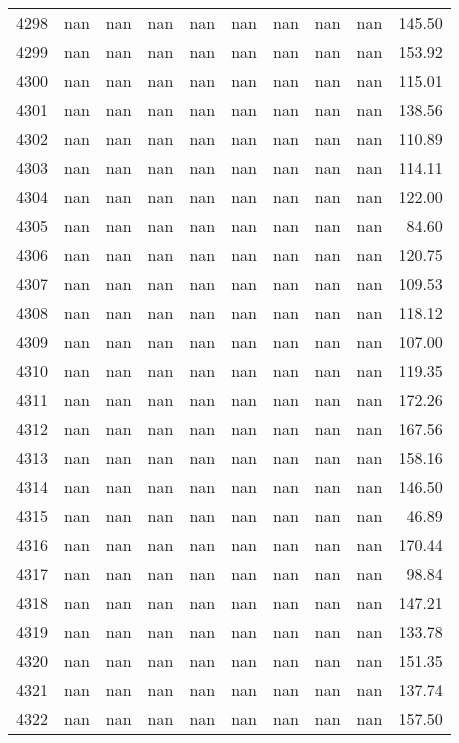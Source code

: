 \begin{tabular}{lrrrrrrrrr}
4298 & nan & nan & nan & nan & nan & nan & nan & nan & 145.50 \\
4299 & nan & nan & nan & nan & nan & nan & nan & nan & 153.92 \\
4300 & nan & nan & nan & nan & nan & nan & nan & nan & 115.01 \\
4301 & nan & nan & nan & nan & nan & nan & nan & nan & 138.56 \\
4302 & nan & nan & nan & nan & nan & nan & nan & nan & 110.89 \\
4303 & nan & nan & nan & nan & nan & nan & nan & nan & 114.11 \\
4304 & nan & nan & nan & nan & nan & nan & nan & nan & 122.00 \\
4305 & nan & nan & nan & nan & nan & nan & nan & nan & 84.60 \\
4306 & nan & nan & nan & nan & nan & nan & nan & nan & 120.75 \\
4307 & nan & nan & nan & nan & nan & nan & nan & nan & 109.53 \\
4308 & nan & nan & nan & nan & nan & nan & nan & nan & 118.12 \\
4309 & nan & nan & nan & nan & nan & nan & nan & nan & 107.00 \\
4310 & nan & nan & nan & nan & nan & nan & nan & nan & 119.35 \\
4311 & nan & nan & nan & nan & nan & nan & nan & nan & 172.26 \\
4312 & nan & nan & nan & nan & nan & nan & nan & nan & 167.56 \\
4313 & nan & nan & nan & nan & nan & nan & nan & nan & 158.16 \\
4314 & nan & nan & nan & nan & nan & nan & nan & nan & 146.50 \\
4315 & nan & nan & nan & nan & nan & nan & nan & nan & 46.89 \\
4316 & nan & nan & nan & nan & nan & nan & nan & nan & 170.44 \\
4317 & nan & nan & nan & nan & nan & nan & nan & nan & 98.84 \\
4318 & nan & nan & nan & nan & nan & nan & nan & nan & 147.21 \\
4319 & nan & nan & nan & nan & nan & nan & nan & nan & 133.78 \\
4320 & nan & nan & nan & nan & nan & nan & nan & nan & 151.35 \\
4321 & nan & nan & nan & nan & nan & nan & nan & nan & 137.74 \\
4322 & nan & nan & nan & nan & nan & nan & nan & nan & 157.50 \\

\end{tabular}
